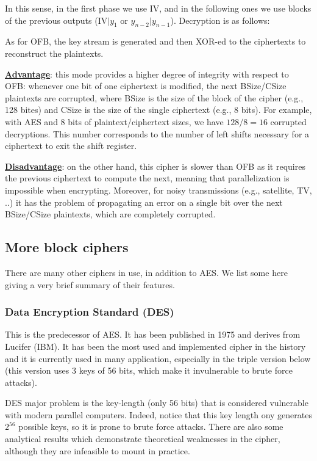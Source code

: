 
In this sense, in the first phase we use IV, and in the following ones we use blocks of the previous outputs ($\text{IV}|y_1$ or $y_{n-2}|y_{n-1}$). Decryption is as follows:


As for OFB, the key stream is generated and then XOR-ed to the ciphertexts to reconstruct the plaintexts.

\underline{\textbf{Advantage}}: this mode provides a higher degree of integrity with respect to OFB: whenever one bit of one ciphertext is modified, the next BSize/CSize plaintexts are corrupted, where BSize is the size of the block of the cipher (e.g., 128 bites) and CSize is the size of the single ciphertext (e.g., 8 bits). For example, with AES and 8 bits of plaintext/ciphertext sizes, we have $128/8 = 16$ corrupted decryptions. This number corresponds to the number of left shifts necessary for a ciphertext to exit the shift register. 

\underline{\textbf{Disadvantage}}: on the other hand, this cipher is slower than OFB as it requires the previous ciphertext to compute the next, meaning that parallelization is impossible when encrypting. Moreover, for noisy transmissions (e.g., satellite, TV, ..) it has the problem of propagating an error on a single bit over the next BSize/CSize plaintexts, which are completely corrupted.

\subsection{More block ciphers}
There are many other ciphers in use, in addition to AES. We list some here giving a very brief summary of their features.

\subsubsection{Data Encryption Standard (DES)}
This is the predecessor of AES. It has been published in 1975 and derives from Lucifer (IBM). It has been the most used and implemented cipher in the history and it is currently used in many application, especially in the triple version below (this version uses 3 keys of 56 bits, which make it invulnerable to brute force attacks). 

DES major problem is the key-length (only 56 bits) that is considered vulnerable with modern parallel computers. Indeed, notice that this key length ony generates $2^{56}$ possible keys, so it is prone to brute force attacks. There are also some analytical results which demonstrate theoretical weaknesses in the cipher, although they are infeasible to mount in practice.

